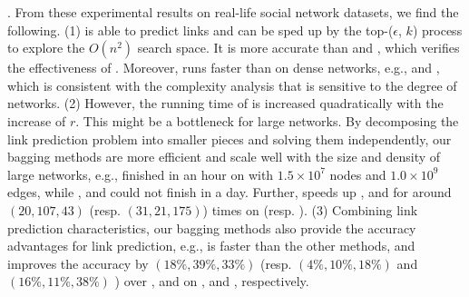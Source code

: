 . From these experimental results on real-life social network datasets,
we find the following. (1) \NMF is able to predict links and can be sped up
by the top-($\epsilon$, $k$) process to explore the $O(n^2)$ search space. It is
more accurate than \Aa and \BIGCLAM, which verifies the effectiveness
of \NMF. Moreover, \NMF runs faster than \BIGCLAM on dense networks,
e.g., \Flickr and \Wikipedia, which is consistent with the complexity analysis
that \BIGCLAM is sensitive to the degree of networks. (2) However, the running time of
\NMF is increased quadratically with the increase of $r$. This might be a bottleneck
for large networks. By decomposing the link prediction problem into smaller pieces
and solving them independently, our bagging methods are more efficient and
scale well with the size and density of large networks,
e.g., \Biased finished in an hour on \Friendster with $1.5\times 10^7$ nodes and
$1.0\times 10^9$ edges, while \NMF, \Aa  and \BIGCLAM could not finish in a day. Further, \Biased speeds up \NMF, \Aa and \BIGCLAM
for around $(20, 107, 43)$ (resp. $(31, 21, 175)$) times on \Twitter (resp. \Friendster).
(3) Combining link prediction characteristics, our
bagging methods also provide the accuracy advantages for link prediction,
e.g., \Biased is faster than the other methods, and improves the accuracy by
$(18\%, 39\%, 33\%)$ (resp. $(4\%, 10\%, 18\%)$ and $(16\%, 11\%, 38\%)$ )
over \NMF, \Aa and \BIGCLAM on \YouTube, \Flickr and \Wikipedia,
respectively.






%
%
%
%
%
%


